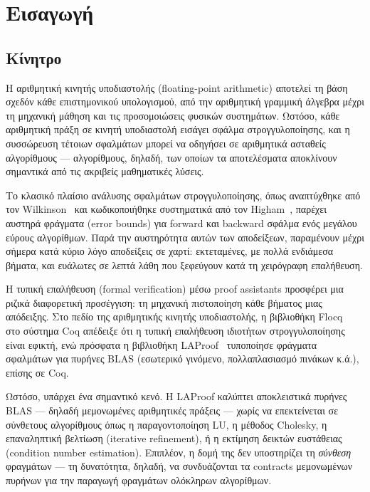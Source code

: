 \documentclass[a4paper,12pt]{article}
\begin{document}
\section{Εισαγωγή}

\subsection{Κίνητρο}

Η αριθμητική κινητής υποδιαστολής (floating-point arithmetic) αποτελεί τη βάση
σχεδόν κάθε επιστημονικού υπολογισμού, από την αριθμητική γραμμική άλγεβρα
μέχρι τη μηχανική μάθηση και τις προσομοιώσεις φυσικών συστημάτων. Ωστόσο,
κάθε αριθμητική πράξη σε κινητή υποδιαστολή εισάγει σφάλμα στρογγυλοποίησης,
και η συσσώρευση τέτοιων σφαλμάτων μπορεί να οδηγήσει σε αριθμητικά ασταθείς
αλγορίθμους --- αλγορίθμους, δηλαδή, των οποίων τα αποτελέσματα αποκλίνουν
σημαντικά από τις ακριβείς μαθηματικές λύσεις.

Το κλασικό πλαίσιο ανάλυσης σφαλμάτων στρογγυλοποίησης, όπως αναπτύχθηκε από
τον Wilkinson~\cite{wilkinson1963} και κωδικοποιήθηκε συστηματικά από τον
Higham~\cite{higham2002}, παρέχει αυστηρά φράγματα (error bounds) για
forward και backward σφάλμα ενός μεγάλου εύρους αλγορίθμων. Παρά την
αυστηρότητα αυτών των αποδείξεων, παραμένουν μέχρι σήμερα κατά κύριο λόγο
αποδείξεις σε χαρτί: εκτεταμένες, με πολλά ενδιάμεσα βήματα, και ευάλωτες σε
λεπτά λάθη που ξεφεύγουν κατά τη χειρόγραφη επαλήθευση.

Η τυπική επαλήθευση (formal verification) μέσω proof assistants προσφέρει μια
ριζικά διαφορετική προσέγγιση: τη μηχανική πιστοποίηση κάθε βήματος μιας
απόδειξης. Στο πεδίο της αριθμητικής κινητής υποδιαστολής, η βιβλιοθήκη
Flocq~\cite{boldo2011flocq} στο σύστημα Coq απέδειξε ότι η τυπική επαλήθευση
ιδιοτήτων στρογγυλοποίησης είναι εφικτή, ενώ πρόσφατα η βιβλιοθήκη
LAProof~\cite{kellison2023} τυποποίησε φράγματα σφαλμάτων για πυρήνες BLAS
(εσωτερικό γινόμενο, πολλαπλασιασμό πινάκων κ.ά.), επίσης σε Coq.

Ωστόσο, υπάρχει ένα σημαντικό κενό. Η LAProof καλύπτει αποκλειστικά πυρήνες
BLAS --- δηλαδή μεμονωμένες αριθμητικές πράξεις --- χωρίς να επεκτείνεται σε
σύνθετους αλγορίθμους όπως η παραγοντοποίηση LU, η μέθοδος Cholesky,
η επαναληπτική βελτίωση (iterative refinement), ή η εκτίμηση δεικτών ευστάθειας
(condition number estimation). Επιπλέον, η δομή της δεν υποστηρίζει τη
\emph{σύνθεση} φραγμάτων --- τη δυνατότητα, δηλαδή, να συνδυάζονται τα
contracts μεμονωμένων πυρήνων για την παραγωγή φραγμάτων ολόκληρων αλγορίθμων.
\end{document}
